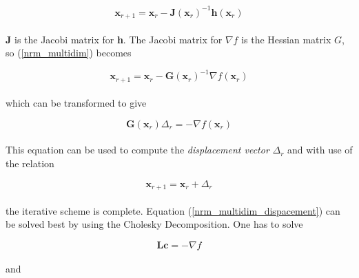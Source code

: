 \documentclass[a4paper,10pt]{thesis}
\begin{document}
\begin{equation}
\textbf{x}_{r+1}=\textbf{x}_r-\textbf{J}(\textbf{x}_r)^{-1}\textbf{h} (\textbf{x}_r) \label{nrm_multidim}
\end{equation}

\paragraph*{}
\textbf{J} is the Jacobi matrix for \textbf{h}. The Jacobi matrix for $\nabla f$ is the Hessian matrix $G$, so (\ref{nrm_multidim}) becomes

\begin{equation}
\textbf{x}_{r+1}=\textbf{x}_r-\textbf{G}(\textbf{x}_r)^{-1}\nabla f(\textbf{x}_r)
\end{equation}

\paragraph*{}
which can be transformed to give

\begin{equation}
\textbf{G}(\textbf{x}_r)\Delta_r=-\nabla f (\textbf{x}_r ) \label{nrm_multidim_dispacement}
\end{equation}

\paragraph*{}
This equation can be used to compute the \emph{displacement vector} $\Delta_r $ and with use of the relation

\begin{equation}
\textbf{x}_{r+1}=\textbf{x}_r + \Delta_r
\end{equation}

\paragraph*{}
the iterative scheme is complete. Equation (\ref{nrm_multidim_dispacement}) can be solved best by using the Cholesky Decomposition. One has to solve

\begin{equation}
\textbf{Lc}=-\nabla f
\end{equation}

\paragraph*{}
and
\end{document}
